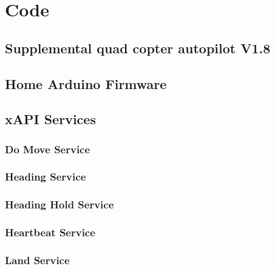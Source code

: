 \documentclass[pdftex,11pt]{article}
\begin{document}
\clearpage


\clearpage

\section{Code}
\label{sec:code}
	\subsection{Supplemental quad copter autopilot V1.8}
	
	
	
	\subsection{Home Arduino Firmware}
		
		
	\subsection{xAPI Services}
		\subsubsection{Do Move Service}
			
			
		\subsubsection{Heading Service}
			
					
		\subsubsection{Heading Hold Service}
			
					
		\subsubsection{Heartbeat Service}
			
					
		\subsubsection{Land Service}
			
					
\end{document}
